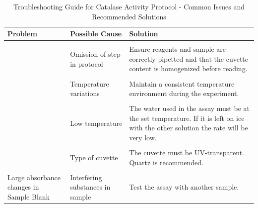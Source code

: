 \documentclass[
  9pt,
  american,
  a5paper,
  extrafontsizes,onecolumn,openright
  ]{memoir}
\newlength{\rf}
\begin{document}
\scriptsize

\begin{table}[!h]
\centering
\caption{\label{tab:cat-troubleshooting}Troubleshooting Guide for Catalase Activity Protocol - Common Issues and Recommended Solutions}
\centering
\fontsize{7}{9}\selectfont
\begin{tabular}[t]{>{\raggedright\arraybackslash}p{10em}>{\raggedright\arraybackslash}p{10em}>{\raggedright\arraybackslash}p{20em}}
\toprule
\textbf{Problem} & \textbf{Possible Cause} & \textbf{Solution}\\
\midrule
\cellcolor{gray!10}{Inconsistent results between runs} & \cellcolor{gray!10}{Inconsistent procedure} & \cellcolor{gray!10}{Standardize procedure, including order of reagent addition, cuvette content homogenization and time between reagent addition and reading.}\\
 & Omission of step in protocol & Ensure reagents and sample are correctly pipetted and that the cuvette content is homogenized before \vphantom{1} reading.\\
\cellcolor{gray!10}{} & \cellcolor{gray!10}{Pipetting errors or incorrect volumes} & \cellcolor{gray!10}{Calibrate pipettes,  ensure consistent technique, and ensure that the final volume of the assay is correct. Remember to adjust the volume of water according to the volume of sample.}\\
 & Temperature variations & Maintain a consistent temperature environment during the experiment.\\
\cellcolor{gray!10}{No change in absorbance over time} & \cellcolor{gray!10}{Incorrect wavelength selected} & \cellcolor{gray!10}{Verify and set the correct wavelength (240 nm).}\\
\addlinespace
 & Low temperature & The water used in the assay must be at the set temperature. If it is left on ice with the other solution the rate will be very low.\\
\cellcolor{gray!10}{} & \cellcolor{gray!10}{Omission of step in protocol} & \cellcolor{gray!10}{Ensure reagents and sample are correctly pipetted and that the cuvette content is homogenized before reading.}\\
 & Type of cuvette & The cuvette must be UV-transparent. Quartz is recommended.\\
\cellcolor{gray!10}{Large absorbance changes in Assay Blank} & \cellcolor{gray!10}{Contaminant in solutions} & \cellcolor{gray!10}{Prepare fresh solutions with ultrapure (type I) water.}\\
Large absorbance changes in Sample Blank & Interfering substances in sample & Test the assay with another sample.\\

\end{tabular}
\end{table}
\end{document}
